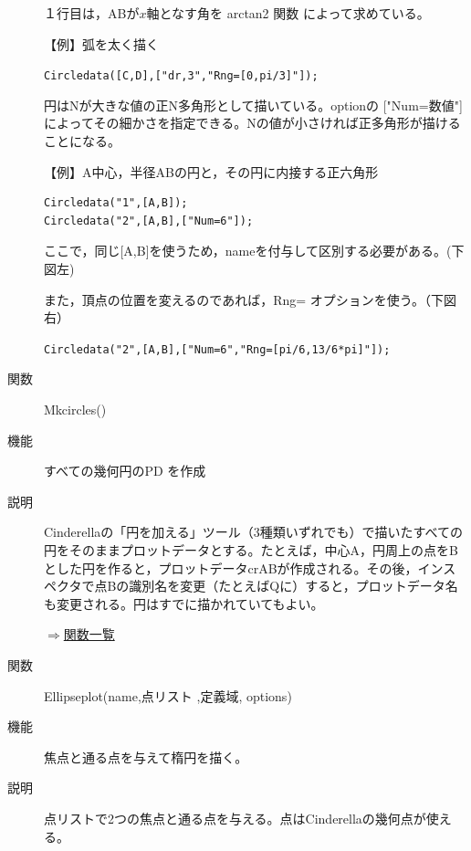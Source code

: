 \documentclass[papersize,a4paper,12pt,uplatex]{jsarticle}
\begin{document}
\begin{description}
１行目は，ABが$x$軸となす角を arctan2 関数 によって求めている。

\vspace{\baselineskip}
【例】弧を太く描く

\verb|Circledata([C,D],["dr,3","Rng=[0,pi/3]"]);|

円はNが大きな値の正N多角形として描いている。optionの ["Num=数値"] によってその細かさを指定できる。Nの値が小さければ正多角形が描けることになる。

\vspace{\baselineskip}
【例】A中心，半径ABの円と，その円に内接する正六角形
\begin{verbatim}
Circledata("1",[A,B]);
Circledata("2",[A,B],["Num=6"]);
\end{verbatim}
ここで，同じ[A,B]を使うため，nameを付与して区別する必要がある。(下図左)

また，頂点の位置を変えるのであれば，Rng= オプションを使う。（下図右）

 \verb|Circledata("2",[A,B],["Num=6","Rng=[pi/6,13/6*pi]"]);|

\hspace{10mm} 
\hspace{5mm}


\vspace{\baselineskip}
\hypertarget{mkcircles}{}
\item[関数]Mkcircles()
\item[機能]すべての幾何円のPD を作成
\item[説明]Cinderellaの「円を加える」ツール（3種類いずれでも）で描いたすべての円をそのままプロットデータとする。たとえば，中心A，円周上の点をBとした円を作ると，プロットデータcrABが作成される。その後，インスペクタで点Bの識別名を変更（たとえばQに）すると，プロットデータ名も変更される。円はすでに描かれていてもよい。

\begin{flushright}\hyperlink{functionlist}{$\Rightarrow$関数一覧}\end{flushright}

\vspace{\baselineskip}
\hypertarget{ellipseplot}{}
\item[関数]Ellipseplot(name,点リスト ,定義域, options)
\item[機能]焦点と通る点を与えて楕円を描く。
\item[説明]点リストで2つの焦点と通る点を与える。点はCinderellaの幾何点が使える。


\end{description}
\end{document}
